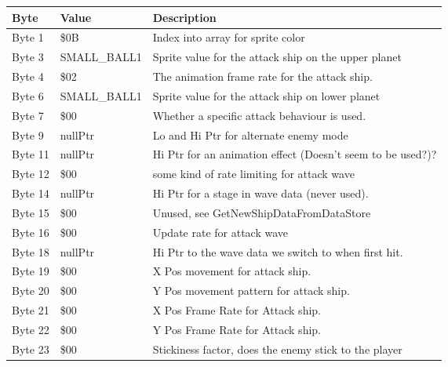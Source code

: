 \begin{figure}[H]
{\begin{adjustbox}{width=12cm}
\begin{tabular}{lll}
\toprule
 Byte    & Value                & Description                                                        \\
\midrule
 Byte 1  & \$0B                  & Index into array for sprite color                                  \\
 Byte 3  & SMALL\_BALL1          & Sprite value for the attack ship on the upper planet               \\
 Byte 4  & \$02                  & The animation frame rate for the attack ship.                      \\
 Byte 6  & SMALL\_BALL1          & Sprite value for the attack ship on lower planet                   \\
 Byte 7  & \$00                  & Whether a specific attack behaviour is used.                       \\
 Byte 9  & nullPtr              & Lo and Hi Ptr for alternate enemy mode                             \\
 Byte 11 & nullPtr              & Hi Ptr for an animation effect (Doesn't seem to be used?)?         \\
 Byte 12 & \$00                  & some kind of rate limiting for attack wave                         \\
 Byte 14 & nullPtr              & Hi Ptr for a stage in wave data (never used).                      \\
 Byte 15 & \$00                  & Unused, see GetNewShipDataFromDataStore                            \\
 Byte 16 & \$00                  & Update rate for attack wave                                        \\
 Byte 18 & nullPtr              & Hi Ptr to the wave data we switch to when first hit.               \\
 Byte 19 & \$00                  & X Pos movement for attack ship.                                    \\
 Byte 20 & \$00                  & Y Pos movement pattern for attack ship.                            \\
 Byte 21 & \$00                  & X Pos Frame Rate for Attack ship.                                  \\
 Byte 22 & \$00                  & Y Pos Frame Rate for Attack ship.                                  \\
 Byte 23 & \$00                  & Stickiness factor, does the enemy stick to the player              \\

\end{tabular}
\end{adjustbox}}
\end{figure}

